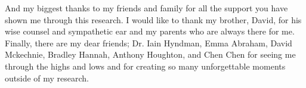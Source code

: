 \documentclass[a4paper,12pt]{report}
\begin{document}
And my biggest thanks to my friends and family for all the support you have shown me through this research. I would like to thank my brother, David, for his wise counsel and sympathetic ear and my parents who  are always there for me. Finally, there are my dear friends; Dr. Iain Hyndman, Emma Abraham, David Mckechnie, Bradley Hannah, Anthony Houghton, and Chen Chen for seeing me through the highs and lows and for creating so many unforgettable moments outside of my research. 

\listoffigures
\listoftables



\tableofcontents















\end{document}
